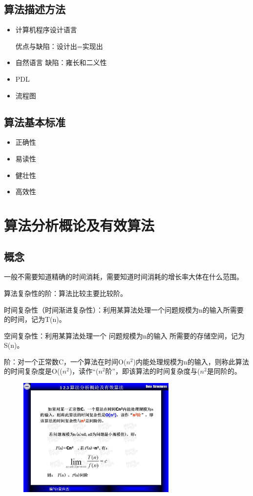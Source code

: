 \documentclass[AutoFakeBold]{LZUThesis2007}
\begin{document}
		\subsection{算法描述方法}
			\begin{itemize}
				\item 计算机程序设计语言

					优点与缺陷：设计出=实现出

				\item 自然语言
					缺陷：雍长和二义性
				\item PDL
				\item 流程图
			\end{itemize}

		\subsection{算法基本标准}
			\begin{itemize}
				\item 正确性
				\item 易读性
				\item 健壮性
				\item 高效性
			\end{itemize}

	\section{算法分析概论及有效算法}
		\subsection{概念}

			一般不需要知道精确的时间消耗，需要知道时间消耗的增长率大体在什么范围。

			算法复杂性的阶：算法比较主要比较阶。

			时间复杂性（时间渐进复杂性）：利用某算法处理一个问题规模为n的输入所需要的时间，记为T(n)。

			空间复杂性：利用某算法处理一个 问题规模为n的输入 所需要的存储空间，记为S(n)。

			阶：对一个正常数C，一个算法在时间Ο($n^{2}$)内能处理规模为n的输入，则称此算法的时间复杂度是Ο(($n^{2}$)，读作“($n^{2}$阶”，即该算法的时间复杂度与($n^{2}$是同阶的。

			\begin{figure}[H]
			    \centering
			    \includegraphics[width=0.7\textwidth]{figures/2.1.jpg}
			    
			    \label{fig_install_texlive}
			\end{figure}
\end{document}
